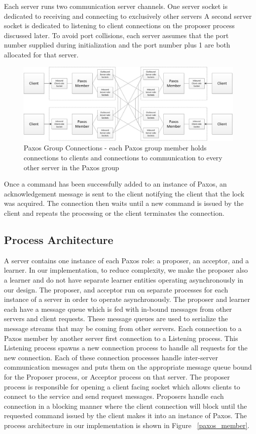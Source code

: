 \documentclass{article}
\begin{document}
Each server runs two communication server channels.
One server socket is dedicated to receiving and connecting to exclusively other servers
A second server socket is dedicated to listening to client connections on the proposer process discussed later.
To avoid port collisions, each server assumes that the port number supplied during initialization and the port number plus 1 are both allocated for that server.

\begin{figure}
\centering
\includegraphics[width=6in]{paxos_group_connections.jpg}
\caption{Paxos Group Connections - each Paxos group member holds connections to clients and connections to communication to every other server in the Paxos group} 
\end{figure}

Once a command has been successfully added to an instance of Paxos, an acknowledgement message is sent to the client notifying the client that the lock was acquired. The connection then waits until a new command is issued by the client and repeats the processing or the client terminates the connection.

\subsection{Process Architecture}

A server contains one instance of each Paxos role: a proposer, an acceptor, and a learner.
In our implementation, to reduce complexity, we make the proposer also a learner and do not have separate learner entities operating asynchronously in our design.
The proposer, and acceptor run on separate processes for each instance of a server in order to operate asynchronously.
The proposer and learner each have a message queue which is fed with in-bound messages from other servers and client requests.
These message queues are used to serialize the message streams that may be coming from other servers.
Each connection to a Paxos member by another server first connection to a Listening process.
This Listening process spawns a new connection process to handle all requests for the new connection.
Each of these connection processes handle inter-server communication messages and puts them on the appropriate message queue bound for the Proposer process, or Acceptor process on that server.
The proposer process is responsible for opening a client facing socket which allows clients to connect to the service and send request messages.
Proposers handle each connection in a blocking manner where the client connection will block until the requested command issued by the client makes it into an instance of Paxos.
The process architecture in our implementation is shown in Figure ~\ref{paxos_member}.
\end{document}
